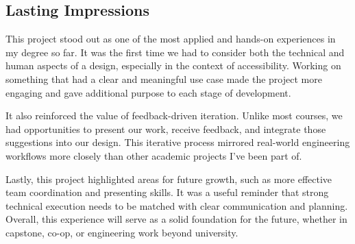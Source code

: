 \documentclass{article}
\begin{document}
\subsection{Lasting Impressions}

This project stood out as one of the most applied and hands-on experiences in my degree so far. It was the first time we had to consider both the technical and human aspects of a design, especially in the context of accessibility. Working on something that had a clear and meaningful use case made the project more engaging and gave additional purpose to each stage of development.

It also reinforced the value of feedback-driven iteration. Unlike most courses, we had opportunities to present our work, receive feedback, and integrate those suggestions into our design. This iterative process mirrored real-world engineering workflows more closely than other academic projects I've been part of.

Lastly, this project highlighted areas for future growth, such as more effective team coordination and presenting skills. It was a useful reminder that strong technical execution needs to be matched with clear communication and planning. Overall, this experience will serve as a solid foundation for the future, whether in capstone, co-op, or engineering work beyond university.
\end{document}
